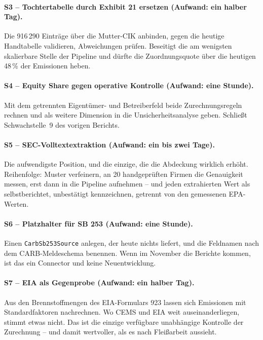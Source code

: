 \documentclass[11pt,a4paper]{article}
\begin{document}
\paragraph{S3 -- Tochtertabelle durch Exhibit 21 ersetzen (Aufwand: ein halber Tag).}
Die 916\,290 Einträge über die Mutter-CIK anbinden, gegen die heutige Handtabelle validieren, Abweichungen prüfen. Beseitigt die am wenigsten skalierbare Stelle der Pipeline und dürfte die Zuordnungsquote über die heutigen 48\,\% der Emissionen heben.

\paragraph{S4 -- Equity Share gegen operative Kontrolle (Aufwand: eine Stunde).}
Mit dem getrennten Eigentümer- und Betreiberfeld beide Zurechnungsregeln rechnen und als weitere Dimension in die Unsicherheitsanalyse geben. Schließt Schwachstelle~9 des vorigen Berichts.

\paragraph{S5 -- SEC-Volltextextraktion (Aufwand: ein bis zwei Tage).}
Die aufwendigste Position, und die einzige, die die Abdeckung wirklich erhöht. Reihenfolge: Muster verfeinern, an 20 handgeprüften Firmen die Genauigkeit messen, erst dann in die Pipeline aufnehmen -- und jeden extrahierten Wert als \glqq selbstberichtet, unbestätigt\grqq{} kennzeichnen, getrennt von den gemessenen EPA-Werten.

\paragraph{S6 -- Platzhalter für SB 253 (Aufwand: eine Stunde).}
Einen \texttt{CarbSb253Source} anlegen, der heute nichts liefert, und die Feldnamen nach dem CARB-Meldeschema benennen. Wenn im November die Berichte kommen, ist das ein Connector und keine Neuentwicklung.

\paragraph{S7 -- EIA als Gegenprobe (Aufwand: ein halber Tag).}
Aus den Brennstoffmengen des EIA-Formulars 923 lassen sich Emissionen mit Standardfaktoren nachrechnen. Wo CEMS und EIA weit auseinanderliegen, stimmt etwas nicht. Das ist die einzige verfügbare unabhängige Kontrolle der Zurechnung -- und damit wertvoller, als es nach Fleißarbeit aussieht.
\end{document}
